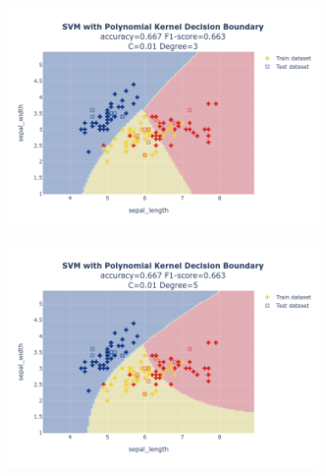 \documentclass{article}
\begin{document}
\begin{figure}
\begin{subfigure}{0.3\textwidth}
        \includegraphics[scale=.13]{images/implementation/q1/polynomial_kernel/sepal_length_sepal_width_0.01_3.png}
    \end{subfigure}
    \hfill
    \begin{subfigure}{0.3\textwidth}
        \centering
        \includegraphics[scale=.13]{images/implementation/q1/polynomial_kernel/sepal_length_sepal_width_0.01_5.png}
    \end{subfigure}
    \hfill
    \begin{subfigure}{0.3\textwidth}
        \centering

\end{subfigure}
\end{figure}
\end{document}
